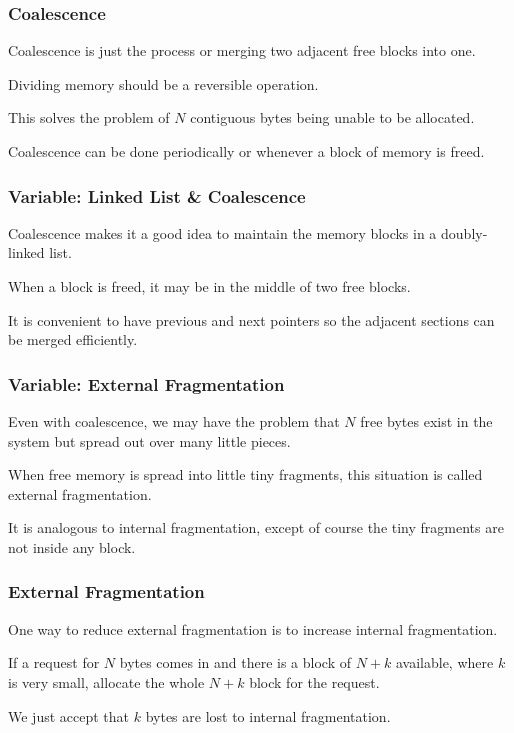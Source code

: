 \begin{frame}
\frametitle{Coalescence}

Coalescence is just the process or merging two adjacent free blocks into one. 

Dividing memory should be a reversible operation. 

This solves the problem of $N$ contiguous bytes being unable to be allocated. 

Coalescence can be done periodically or whenever a block of memory is freed.


\end{frame}

\begin{frame}
\frametitle{Variable: Linked List \& Coalescence}

Coalescence makes it a good idea to maintain the memory blocks in a doubly-linked list.

When a block is freed, it may be in the middle of two free blocks. 

It is convenient to have previous and next pointers so the adjacent sections can be merged efficiently.


\end{frame}

\begin{frame}
\frametitle{Variable: External Fragmentation}

Even with coalescence, we may have the problem that $N$ free bytes exist in the system but spread out over many little pieces.

When free memory is spread into little tiny fragments, this situation is called \alert{external fragmentation}. 

It is analogous to internal fragmentation, except of course the tiny fragments are not inside any block.


\end{frame}

\begin{frame}
\frametitle{External Fragmentation}

One way to reduce external fragmentation is to increase internal fragmentation. 

If a request for $N$ bytes comes in and there is a block of $N+k$ available, where $k$ is very small, allocate the whole $N+k$ block for the request.

We just accept that $k$ bytes are lost to internal fragmentation.

\end{frame}

